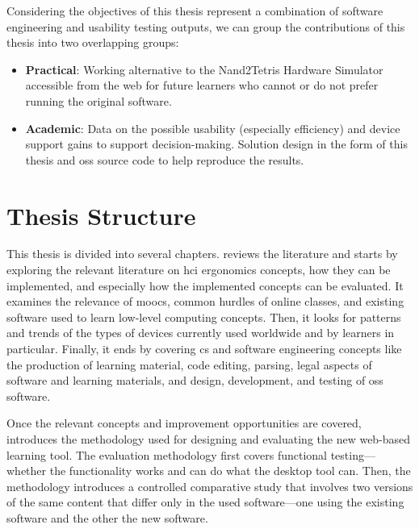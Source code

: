 Considering the objectives of this thesis represent a combination of software engineering and usability testing outputs, we can group the contributions of this thesis into two overlapping groups:

\begin{itemize}
    \item \textbf{Practical}: Working alternative to the Nand2Tetris Hardware Simulator accessible from the web for future learners who cannot or do not prefer running the original software.
    \item \textbf{Academic}: Data on the possible usability (especially efficiency) and device support gains to support decision-making. Solution design in the form of this thesis and \gls{oss} source code to help reproduce the results.
\end{itemize}

\section{Thesis Structure}

This thesis is divided into several chapters.
 reviews the literature and starts by exploring the relevant literature on \gls{hci} ergonomics concepts, how they can be implemented, and especially how the implemented concepts can be evaluated.
It examines the relevance of \glspl{mooc}, common hurdles of online classes, and existing software used to learn low-level computing concepts.
Then, it looks for patterns and trends of the types of devices currently used worldwide and by learners in particular.
Finally, it ends by covering \gls{cs} and software engineering concepts like the production of learning material, code editing, parsing, legal aspects of software and learning materials, and design, development, and testing of \gls{oss} software.

Once the relevant concepts and improvement opportunities are covered,  introduces the methodology used for designing and evaluating the new web-based learning tool.
The evaluation methodology first covers functional testing---whether the functionality works and can do what the desktop tool can.
Then, the methodology introduces a controlled comparative study that involves two versions of the same content that differ only in the used software---one using the existing software and the other the new software.

